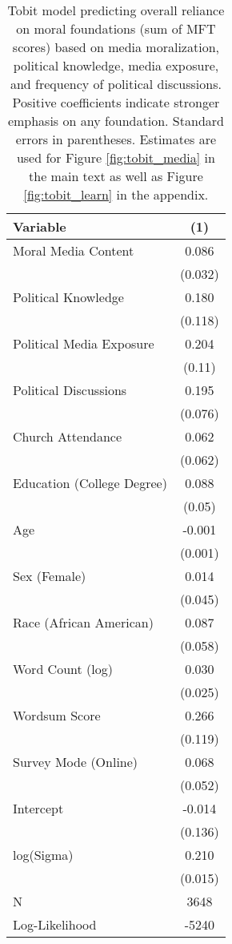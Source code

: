 \begin{table}[ht]
\centering
\caption[Tobit model 
           predicting overall reliance on moral foundations
           (sum of MFT scores) based on media moralization, political knowledge, media exposure, and frequency of 
           political discussions]{Tobit model predicting overall reliance on moral foundations
           (sum of MFT scores) based on media moralization, political knowledge, media exposure, and frequency of 
           political discussions. Positive coefficients indicate stronger emphasis on any foundation.
           Standard errors in parentheses. Estimates are used for Figure \ref{fig:tobit_media} in 
           the main text as well as Figure \ref{fig:tobit_learn} in the appendix.} 
\label{tab:tobit_learn}
\begingroup\footnotesize
\begin{tabular}{lc}
  \hline
Variable & (1) \\ 
  \hline
Moral Media Content &  0.086 \\ 
   & (0.032) \\ 
  Political Knowledge &  0.180 \\ 
   & (0.118) \\ 
  Political Media Exposure &  0.204 \\ 
   & (0.11) \\ 
  Political
Discussions &  0.195 \\ 
   & (0.076) \\ 
  Church Attendance &  0.062 \\ 
   & (0.062) \\ 
  Education (College Degree) &  0.088 \\ 
   & (0.05) \\ 
  Age & -0.001 \\ 
   & (0.001) \\ 
  Sex (Female) &  0.014 \\ 
   & (0.045) \\ 
  Race (African American) &  0.087 \\ 
   & (0.058) \\ 
  Word Count (log) &  0.030 \\ 
   & (0.025) \\ 
  Wordsum Score &  0.266 \\ 
   & (0.119) \\ 
  Survey Mode (Online) &  0.068 \\ 
   & (0.052) \\ 
  Intercept & -0.014 \\ 
   & (0.136) \\ 
  log(Sigma) &  0.210 \\ 
   & (0.015) \\ 
   \hline
N & 3648 \\ 
  Log-Likelihood & -5240 \\ 
   \hline
\end{tabular}
\endgroup
\end{table}
